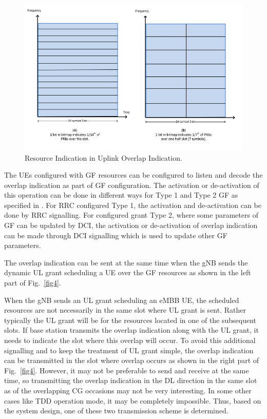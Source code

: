 \documentclass[conference]{IEEEtran}
\begin{document}
\begin{figure}[htbp]
\centerline{\includegraphics[scale=0.2]{fig3.png}}
\caption{Resource Indication in Uplink Overlap Indication.}
\label{fig3}
\end{figure}

The UEs configured with GF resources can be configured to listen and decode the overlap indication as part of GF configuration. The activation or de-activation of this operation can be done in different ways for Type 1 and Type 2 GF as specified in \cite{ad4}. For RRC configured Type 1, the activation and de-activation can be done by RRC signalling. For configured grant Type 2, where some parameters of GF can be updated by DCI, the activation or de-activation of overlap indication can be made through DCI signalling which is used to update other GF parameters.

The overlap indication can be sent at the same time when the gNB sends the dynamic UL grant scheduling a UE over the GF resources as shown in the left part of Fig.~\ref{fig4}.

When the gNB sends an UL grant scheduling an eMBB UE, the scheduled resources are not necessarily in the same slot where UL grant is sent. Rather typically the UL grant will be for the resources located in one of the subsequent slots. If base station transmits the overlap indication along with the UL grant, it needs to indicate the slot where this overlap will occur. To avoid this additional signalling and to keep the treatment of UL grant simple, the overlap indication can be transmitted in the slot where overlap occurs as shown in the right part of Fig.~\ref{fig4}. However, it may not be preferable to send and receive at the same time, so transmitting the overlap indication in the DL direction in the same slot as of the overlapping CG occasions may not be very interesting. In some other cases like TDD operation mode, it may be completely impossible. Thus, based on the system design, one of these two transmission scheme is determined.
\end{document}
